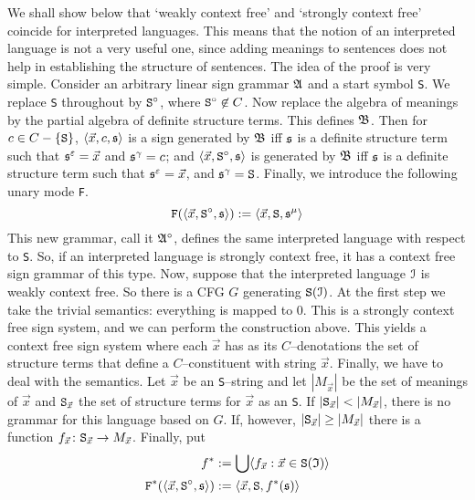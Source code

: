 We shall show below that `weakly context free' and `strongly context 
free' coincide for interpreted languages. This means that the notion 
of an interpreted language is not a very useful one, since adding 
meanings to sentences does not help in establishing the structure of 
sentences. The idea of the proof is very simple. Consider an 
arbitrary linear sign grammar $\mathfrak{A}$ and a start symbol 
{\tt S}. We replace {\tt S} throughout by $\mbox{\tt S}^{\circ}$, 
where $\mbox{\tt S}^{\circ} \not\in C$. Now replace the algebra of 
meanings by the partial algebra of definite structure terms. This 
defines $\mathfrak{B}$.  Then for $c \in C - \{\mbox{\tt S}\}$, 
$\langle \vec{x}, c, \mathfrak{s}\rangle$ is a sign generated by $\mathfrak{B}$ iff 
$\mathfrak{s}$ is a definite structure term such that $\mathfrak{s}^{\varepsilon} = 
\vec{x}$ and $\mathfrak{s}^{\gamma} = c$; 
and $\langle \vec{x}, \mbox{\tt S}^{\circ}, \mathfrak{s}\rangle$ is generated 
by $\mathfrak{B}$ iff $\mathfrak{s}$ is a definite structure term such that 
$\mathfrak{s}^{\varepsilon} = \vec{x}$, and $\mathfrak{s}^{\gamma} = \mbox{\tt S}$. 
Finally, we introduce the following unary mode {\tt F}.
\begin{equation}
\mbox{\tt F}(\langle \vec{x}, \mbox{\tt S}^{\circ}, \mathfrak{s}\rangle) := 
	\langle \vec{x}, \mbox{\tt S}, \mathfrak{s}^{\mu}\rangle
\end{equation}
This new grammar, call it $\mathfrak{A}^{\circ}$, defines the same interpreted 
language with respect to {\tt S}. So, if an interpreted language is 
strongly context free, it has a context free sign grammar of this 
type. Now, suppose that the interpreted language $\mathcal{I}$ is weakly 
context free. So there is a CFG $G$ generating $\mbox{\tt S}(\mathcal{I})$. 
At the first step we take the trivial semantics: everything is mapped 
to $0$. This is a strongly context free sign system, and 
we can perform the construction above. This yields a context free 
sign system where each $\vec{x}$ has as its $C$--denotations the 
set of structure terms that define a $C$--constituent with string 
$\vec{x}$. Finally, we have to deal with the semantics. Let $\vec{x}$ 
be an {\tt S}--string and let $|M_{\vec{x}}|$ be the set of meanings 
of $\vec{x}$ and $\mbox{\tt S}_{\vec{x}}$ the set of structure terms for 
$\vec{x}$ as an {\tt S}. If $|\mbox{\tt S}_{\vec{x}}| < |M_{\vec{x}}|$, 
there is no grammar for this language based on $G$. If, however, 
$|\mbox{\tt S}_{\vec{x}}| \geq |M_{\vec{x}}|$ there is a function 
$f_{\vec{x}} \colon \mbox{\tt S}_{\vec{x}} \rightarrow M_{\vec{x}}$. Finally, 
put 
\begin{equation}
\begin{split}
f^{\ast} & := \bigcup \langle f_{\vec{x}} : \vec{x} \in \mbox{\tt S}(\mathfrak{I})\rangle \\
\mbox{\tt F}^{\ast}(\langle \vec{x}, \mbox{\tt S}^{\circ}, \mathfrak{s}\rangle) & := 
	\langle \vec{x}, \mbox{\tt S}, f^{\ast}(\mathfrak{s})\rangle
\end{split}
\end{equation}
